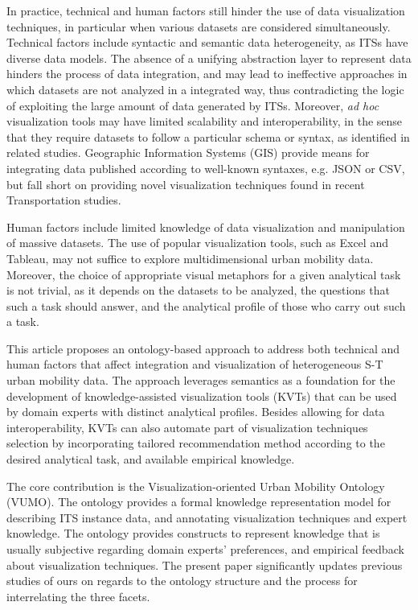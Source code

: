 \documentclass[]{interact}
\theoremstyle{plain}%
\theoremstyle{definition}
\theoremstyle{remark}
\theoremstyle{definition}
\begin{document}
In practice, technical and human factors still hinder the use of data visualization techniques, in particular when various datasets are considered simultaneously. Technical factors include syntactic and semantic data heterogeneity, as ITSs have diverse data models. The absence of a unifying abstraction layer to represent data hinders the process of data integration, and may lead to ineffective approaches in which datasets are not analyzed in a integrated way, thus contradicting the logic of exploiting the large amount of data generated by ITSs. Moreover, \emph{ad hoc} visualization tools may have limited scalability and interoperability, in the sense that they require datasets to follow a particular schema or syntax, as identified in related studies. Geographic Information Systems (GIS) provide means for integrating data published according to well-known syntaxes, e.g. JSON or CSV, but fall short on providing novel visualization techniques found in recent Transportation studies.

Human factors include limited knowledge of data visualization and manipulation of massive datasets. The use of popular visualization tools, such as Excel and Tableau, may not suffice to explore multidimensional urban mobility data. Moreover, the choice of appropriate visual metaphors for a given analytical task is not trivial, as it depends on the datasets to be analyzed, the questions that such a task should answer, and the analytical profile of those who carry out such a task.

This article proposes an ontology-based approach to address both technical and human factors that affect integration and visualization of heterogeneous S-T urban mobility data. The approach leverages semantics as a foundation for the development of knowledge-assisted visualization tools (KVTs) that can be used by domain experts with distinct analytical profiles. Besides allowing for data interoperability, KVTs can also automate part of visualization techniques selection by incorporating tailored recommendation method according to the desired analytical task, and available empirical knowledge.

The core contribution is the Visualization-oriented Urban Mobility Ontology (VUMO). The ontology provides a formal knowledge representation model for describing ITS instance data, and annotating visualization techniques and expert knowledge. The ontology provides constructs to represent knowledge that is usually subjective regarding domain experts' preferences, and empirical feedback about visualization techniques. The present paper significantly updates previous studies of ours \citep{Sobral2017} on regards to the ontology structure and the process for interrelating the three facets.
\end{document}

